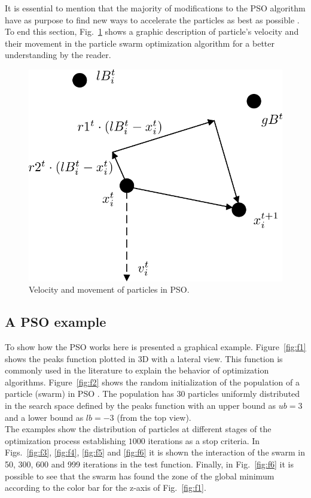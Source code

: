 It is essential to mention that the majority of modifications to the PSO algorithm have as purpose to find new ways to accelerate the particles as best as possible \cite{erick2016optimizacion}. To end this section, Fig.~\ref{fig:PSOmovement} shows a graphic description of particle's velocity and their movement in the particle swarm optimization algorithm for a better understanding by the reader.\\

\begin{figure}[h!]
\centering
\includegraphics[scale=0.4]{"Part 2 - Search-Based Optimization/Particle Swarm Optimization/Images/Fig.1.3.png"}
\caption{Velocity and movement of particles in PSO.}
\label{fig:PSOmovement}
\end{figure}

\subsection{A PSO example}

To show how the PSO works here is presented a graphical example. Figure~\ref{fig:f1} shows the peaks function plotted in 3D with a lateral view. This function is commonly used in the literature to explain the behavior of optimization algorithms. Figure~\ref{fig:f2} shows the random initialization of the population of a particle (swarm) in PSO \cite{kennedy1995particle}. The population has 30 particles uniformly distributed in the search space defined by the peaks function with an upper bound as $ub=3$ and a lower bound as $lb=-3$ (from the top view).\\
The examples show the distribution of particles at different stages of the optimization process establishing $1000$ iterations as a stop criteria. In Figs.~\ref{fig:f3}, \ref{fig:f4}, \ref{fig:f5} and \ref{fig:f6} it is shown the interaction of the swarm in 50, 300, 600 and 999 iterations in the test function. Finally, in Fig.~\ref{fig:f6} it is possible to see that the swarm has found the zone of the global minimum according to the color bar for the z-axis of Fig.~\ref{fig:f1}.

